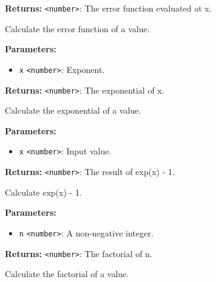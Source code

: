 \documentclass[12pt,a4paper]{article}
\begin{document}
\noindent \textbf{Returns:} \texttt{<number>}: The error function evaluated at x.

\noindent Calculate the error function of a value.

\vspace{5mm}
\noindent {}


\noindent \textbf{Parameters:}
\begin{itemize}
  \item \texttt{x} \texttt{<number>}: Exponent.
\end{itemize}

\noindent \textbf{Returns:} \texttt{<number>}: The exponential of x.

\noindent Calculate the exponential of a value.

\vspace{5mm}
\noindent {}


\noindent \textbf{Parameters:}
\begin{itemize}
  \item \texttt{x} \texttt{<number>}: Input value.
\end{itemize}

\noindent \textbf{Returns:} \texttt{<number>}: The result of exp(x) - 1.

\noindent Calculate exp(x) - 1.

\vspace{5mm}
\noindent {}


\noindent \textbf{Parameters:}
\begin{itemize}
  \item \texttt{n} \texttt{<number>}: A non-negative integer.
\end{itemize}

\noindent \textbf{Returns:} \texttt{<number>}: The factorial of n.

\noindent Calculate the factorial of a value.

\vspace{5mm}
\noindent {}\vspace{4mm}
\end{document}
